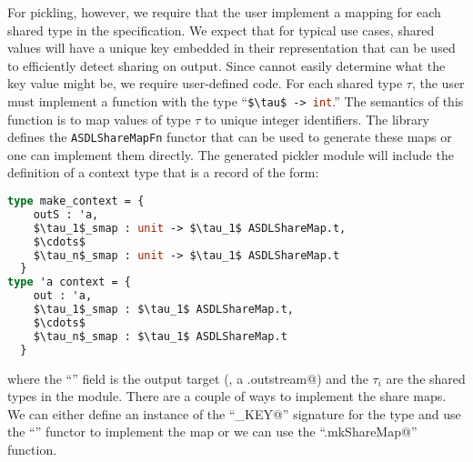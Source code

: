For pickling, however, we require that the user implement a mapping for
each shared type in the specification.
We expect that for typical use cases, shared values will have a unique key
embedded in their representation that can be used to efficiently detect sharing on
output.
Since \asdlgen{} cannot easily determine what the key value might be, we
require user-defined code.
For each shared type $\tau$, the user must implement a function with the
type ``\lstinline[language=sml,mathescape=true]@$\tau$ -> int@.''
The semantics of this function is to map values of type $\tau$ to unique integer
identifiers.
The \asdl{} library defines the \lstinline[language=sml]@ASDLShareMapFn@ functor
that can be used to generate these maps or one can implement them directly.
The generated pickler module will include the definition of a context type
that is a record of the form:
\begin{code}
\begin{lstlisting}[language=sml,mathescape=true]
type make_context = {
    outS : 'a,
    $\tau_1$_smap : unit -> $\tau_1$ ASDLShareMap.t,
    $\cdots$
    $\tau_n$_smap : unit -> $\tau_1$ ASDLShareMap.t
  }
type 'a context = {
    out : 'a,
    $\tau_1$_smap : $\tau_1$ ASDLShareMap.t,
    $\cdots$
    $\tau_n$_smap : $\tau_1$ ASDLShareMap.t
  }
\end{lstlisting}%
\end{code}%
where the ``\lstinline@outS@'' field is the output target (\eg{}, a
\lstinline@TextIO.outstream@) and the $\tau_i$ are the shared types
in the module.
There are a couple of ways to implement the share maps.  We can either
define an instance of the ``\lstinline@HASH_KEY@'' signature for the type
and use the ``\lstinline@ASDLShareMapFn@'' functor to implement the map
or we can use the ``\lstinline@ASDLShareMap.mkShareMap@'' function.

